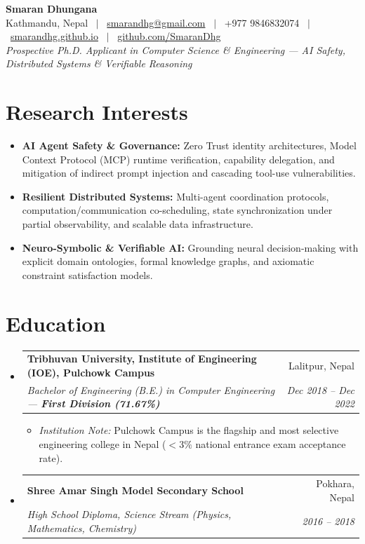 \documentclass[10pt,letterpaper]{article}
\makeatletter
\newcommand{\resumeSubheading}[4]{
  \vspace{0.5pt}
  \item[]
    \begin{tabular*}{\linewidth}[t]{l@{\extracolsep{\fill}}r}
      \textbf{#1} & \small #2 \\
      \textit{\small#3} & \textit{\small #4} \\
    \end{tabular*}\vspace{-5pt}
}
\makeatother
\begin{document}
\begin{center}
  {\Huge \textbf{Smaran Dhungana}} \\ \vspace{3pt}
  \small
  Kathmandu, Nepal \ $|$ \ 
  \href{mailto:smarandhg@gmail.com}{smarandhg@gmail.com} \ $|$ \ 
  +977 9846832074 \ $|$ \ 
  \href{https://smarandhg.github.io}{smarandhg.github.io} \ $|$ \ 
  \href{https://github.com/SmaranDhg}{github.com/SmaranDhg}
  \\ \vspace{2pt}
  \textit{Prospective Ph.D. Applicant in Computer Science \& Engineering --- AI Safety, Distributed Systems \& Verifiable Reasoning}
\end{center}

\vspace{-8pt}

\section{Research Interests}
\begin{itemize}[leftmargin=*,itemsep=1pt,topsep=1pt]
  \item \textbf{AI Agent Safety \& Governance:} Zero Trust identity architectures, Model Context Protocol (MCP) runtime verification, capability delegation, and mitigation of indirect prompt injection and cascading tool-use vulnerabilities.
  \item \textbf{Resilient Distributed Systems:} Multi-agent coordination protocols, computation/communication co-scheduling, state synchronization under partial observability, and scalable data infrastructure.
  \item \textbf{Neuro-Symbolic \& Verifiable AI:} Grounding neural decision-making with explicit domain ontologies, formal knowledge graphs, and axiomatic constraint satisfaction models.
\end{itemize}

\section{Education}
\begin{itemize}[leftmargin=*,label={}]
  \resumeSubheading
    {Tribhuvan University, Institute of Engineering (IOE), Pulchowk Campus}{Lalitpur, Nepal}
    {Bachelor of Engineering (B.E.) in Computer Engineering --- \textbf{First Division (71.67\%)}}{Dec 2018 -- Dec 2022}
    \begin{itemize}[leftmargin=*,itemsep=0.5pt,topsep=1pt]
      \item \textit{Institution Note:} Pulchowk Campus is the flagship and most selective engineering college in Nepal ($<3\%$ national entrance exam acceptance rate).
    \end{itemize}

  \resumeSubheading
    {Shree Amar Singh Model Secondary School}{Pokhara, Nepal}
    {High School Diploma, Science Stream (Physics, Mathematics, Chemistry)}{2016 -- 2018}
\end{itemize}
\end{document}
